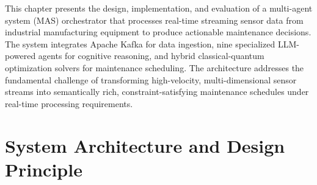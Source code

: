 This chapter presents the design, implementation, and evaluation of a multi-agent system (MAS) orchestrator that processes real-time streaming sensor data from industrial manufacturing equipment to produce actionable maintenance decisions. The system integrates Apache Kafka for data ingestion, nine specialized LLM-powered agents for cognitive reasoning, and hybrid classical-quantum optimization solvers for maintenance scheduling. The architecture addresses the fundamental challenge of transforming high-velocity, multi-dimensional sensor streams into semantically rich, constraint-satisfying maintenance schedules under real-time processing requirements.

\section{System Architecture and Design Principle}
